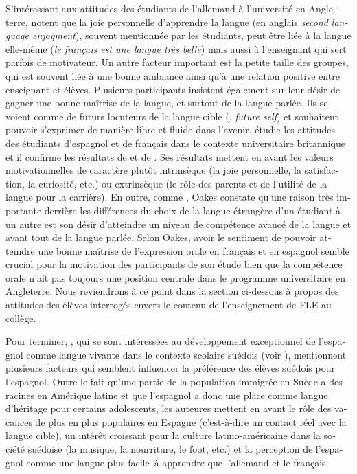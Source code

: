 \documentclass[french, output=paper]{langscibook}
\begin{document}
\begin{otherlanguage}{french}
S’intéressant aux attitudes des étudiants de l’allemand à l’université en Angleterre, \citet{BusseWilliams2010} notent que la joie personnelle d’apprendre la langue (en anglais \textit{second language enjoyment}), souvent mentionnée par les étudiants, peut être liée à la langue elle-même (\textit{le français est une langue très belle}) mais aussi à l’enseignant qui sert parfois de motivateur. Un autre facteur important est la petite taille des groupes, qui est souvent liée à une bonne ambiance ainsi qu’à une relation positive entre enseignant et élèves. Plusieurs participants insistent également sur leur désir de gagner une bonne maîtrise de la langue, et surtout de la langue parlée. Ils se voient comme de futurs locuteurs de la langue cible (\citealt{Dörnyei2009l2}, \textit{future self}) et souhaitent pouvoir s’exprimer de manière libre et fluide dans l’avenir. \citet{Oakes2013} étudie les attitudes des étudiants d’espagnol et de français dans le contexte universitaire britannique et il confirme les résultats de \citet{BusseWilliams2010} et de \citet{Busse2017}. Ses résultats mettent en avant les valeurs motivationnelles de caractère plutôt intrinsèque (la joie personnelle, la satisfaction, la curiosité, etc.) ou extrinsèque (le rôle des parents et de l’utilité de la langue pour la carrière). En outre, comme \citet{BusseWilliams2010}, Oakes constate qu’une raison très importante derrière les différences du choix de la langue étrangère d’un étudiant à un autre est son désir d’atteindre un niveau de compétence avancé de la langue et avant tout de la langue parlée. Selon Oakes, avoir le sentiment de pouvoir atteindre une bonne maîtrise de l’expression orale en français et en espagnol semble crucial pour la motivation des participants de son étude bien que la compétence orale n’ait pas toujours une position centrale dans le programme universitaire en Angleterre. Nous reviendrons à ce point dans la section   ci-dessous à propos des attitudes des élèves interrogés envers le contenu de l’enseignement de FLE au collège.

Pour terminer, \citet{RiisFrancia2013}, qui se sont intéressées au développement exceptionnel de l’espagnol comme langue vivante dans le contexte scolaire suédois (voir ), mentionnent plusieurs facteurs qui semblent influencer la préférence des élèves suédois pour l’espagnol. Outre le fait qu’une partie de la population immigrée en Suède a des racines en Amérique latine et que l’espagnol a donc une place comme langue d’héritage pour certains adolescents, les auteures mettent en avant le rôle des vacances de plus en plus populaires en Espagne (c’est-à-dire un contact réel avec la langue cible), un intérêt croissant pour la culture latino-américaine dans la société suédoise (la musique, la nourriture, le foot, etc.) et la perception de l’espagnol comme une langue plus facile~à apprendre que l’allemand et le français. 


\end{otherlanguage}
\end{document}
